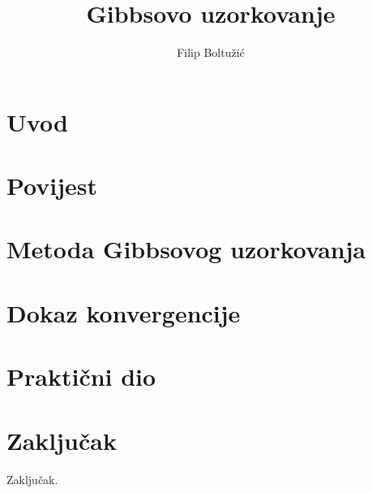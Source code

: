 \documentclass[times, utf8, seminar]{fer}
\begin{document}

\title{Gibbsovo uzorkovanje}

\author{Filip Boltužić}
\maketitle

\tableofcontents

\chapter{Uvod}


\chapter{Povijest}


\chapter{Metoda Gibbsovog uzorkovanja}


\chapter{Dokaz konvergencije}


\chapter{Praktični dio}


\chapter{Zaključak}
Zaključak.



\end{document}
